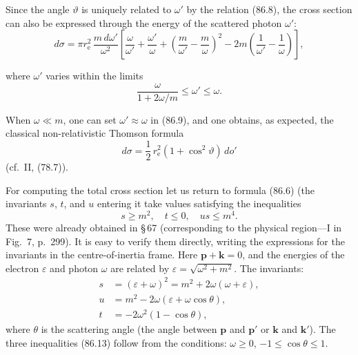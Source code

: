 Since the angle $\vartheta$ is uniquely related to $\omega'$ by the relation (86.8), the cross section can also be expressed through the energy of the scattered photon $\omega'$:
\begin{equation}
d\sigma = \pi r_\mathrm{e}^2\,\frac{m\,d\omega'}{\omega^2}\left[\frac{\omega}{\omega'} + \frac{\omega'}{\omega} + \left(\frac{m}{\omega'} - \frac{m}{\omega}\right)^{\!2} - 2m\left(\frac{1}{\omega'} - \frac{1}{\omega}\right)\right],
\label{eq:86.10}
\end{equation}


where $\omega'$ varies within the limits
\begin{equation}
\frac{\omega}{1 + 2\omega/m} \leqslant \omega' \leqslant \omega.
\label{eq:86.11}
\end{equation}

When $\omega \ll m$, one can set $\omega' \approx \omega$ in (86.9), and one obtains, as expected, the classical non-relativistic Thomson formula
\begin{equation}
d\sigma = \frac{1}{2}\,r_\mathrm{e}^2(1 + \cos^2\vartheta)\,do'
\label{eq:86.12}
\end{equation}
(cf.\ II, (78.7)).

For computing the total cross section let us return to formula (86.6) (the invariants $s$, $t$, and $u$ entering it take values satisfying the inequalities
\begin{equation}
s \geqslant m^2, \quad t \leqslant 0, \quad us \leqslant m^4.
\label{eq:86.13}
\end{equation}
These were already obtained in \S\,67 (corresponding to the physical region---I in Fig.~7, p.~299). It is easy to verify them directly, writing the expressions for the invariants in the centre-of-inertia frame. Here $\mathbf{p} + \mathbf{k} = 0$, and the energies of the electron $\varepsilon$ and photon $\omega$ are related by $\varepsilon = \sqrt{\omega^2 + m^2}$. The invariants:
\begin{equation}
\begin{aligned}
s &= (\varepsilon + \omega)^2 = m^2 + 2\omega(\omega + \varepsilon), \\
u &= m^2 - 2\omega(\varepsilon + \omega\cos\theta), \\
t &= -2\omega^2(1 - \cos\theta),
\end{aligned}
\label{eq:86.14}
\end{equation}
where $\theta$ is the scattering angle (the angle between $\mathbf{p}$ and $\mathbf{p}'$ or $\mathbf{k}$ and $\mathbf{k}'$). The three inequalities (86.13) follow from the conditions: $\omega \geqslant 0$, $-1 \leqslant \cos\theta \leqslant 1$.


